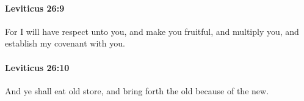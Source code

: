		\paragraph{Leviticus 26:9} %
			\label{LEVITICUS-26-9}

			For I will have respect unto you, and make you fruitful, and multiply you, and establish my covenant with you.


		\paragraph{Leviticus 26:10} %
			\label{LEVITICUS-26-10}

			And ye shall eat old store, and bring forth the old because of the new.


